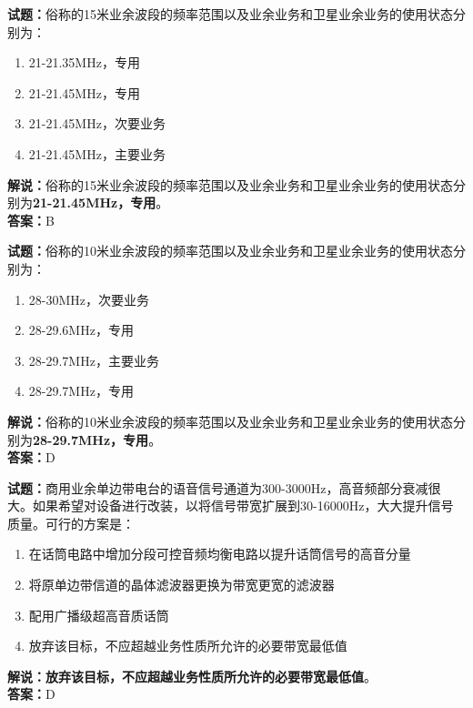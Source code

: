 \documentclass{ctexbook}
\begin{document}
\noindent\textbf{试题：}俗称的15米业余波段的频率范围以及业余业务和卫星业余业务的使用状态分别为：
\begin{enumerate}[leftmargin=3em]
  \item 21-21.35\unit{\MHz}，专用
  \item 21-21.45\unit{\MHz}，专用
  \item 21-21.45\unit{\MHz}，次要业务
  \item 21-21.45\unit{\MHz}，主要业务
\end{enumerate}
\noindent\textbf{解说：}俗称的15米业余波段的频率范围以及业余业务和卫星业余业务的使用状态分别为\textbf{21-21.45\unit{\MHz}，专用}。\\\noindent\textbf{答案：}B

\bigskip

\noindent\textbf{试题：}俗称的10米业余波段的频率范围以及业余业务和卫星业余业务的使用状态分别为：
\begin{enumerate}[leftmargin=3em]
  \item 28-30\unit{\MHz}，次要业务
  \item 28-29.6\unit{\MHz}，专用
  \item 28-29.7\unit{\MHz}，主要业务
  \item 28-29.7\unit{\MHz}，专用
\end{enumerate}
\noindent\textbf{解说：}俗称的10米业余波段的频率范围以及业余业务和卫星业余业务的使用状态分别为\textbf{28-29.7\unit{\MHz}，专用}。\\\noindent\textbf{答案：}D

\bigskip

\noindent\textbf{试题：}商用业余单边带电台的语音信号通道为300-3000Hz，高音频部分衰减很大。如果希望对设备进行改装，以将信号带宽扩展到30-16000Hz，大大提升信号质量。可行的方案是：
\begin{enumerate}[leftmargin=3em]
  \item 在话筒电路中增加分段可控音频均衡电路以提升话筒信号的高音分量
  \item 将原单边带信道的晶体滤波器更换为带宽更宽的滤波器
  \item 配用广播级超高音质话筒
  \item 放弃该目标，不应超越业务性质所允许的必要带宽最低值
\end{enumerate}
\noindent\textbf{解说：}\textbf{放弃该目标，不应超越业务性质所允许的必要带宽最低值}。\\\noindent\textbf{答案：}D

\bigskip
\end{document}
